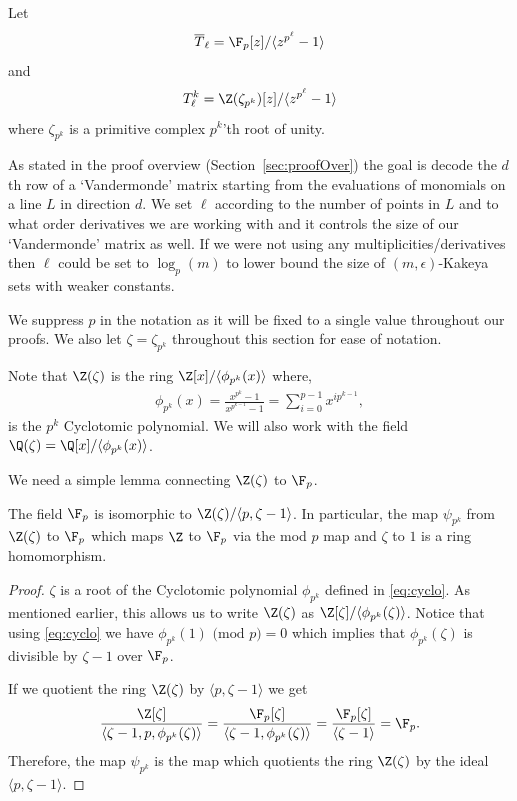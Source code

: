 \begin{define}
Let 
$$\overline{T}_{\ell}=\F_p[z]/\langle z^{p^\ell}-1\rangle$$ 
and 
$$T_{\ell}^k=\Z(\zeta_{p^k})[z]/\langle z^{p^\ell} -1\rangle$$
where $\zeta_{p^k}$ is a primitive complex $p^k$'th root of unity.
\end{define}

As stated in the proof overview (Section~\ref{sec:proofOver}) the goal is decode the $d$th row of a `Vandermonde' matrix starting from the evaluations of monomials on a line $L$ in direction $d$. We set $\ell$ according to the number of points in $L$ and to what order derivatives we are working with and it controls the size of our `Vandermonde' matrix as well. If we were not using any multiplicities/derivatives then $\ell$ could be set to $\log_p(m)$ to lower bound the size of $(m,\epsilon)$-Kakeya sets with weaker constants.

We suppress $p$ in the notation as it will be fixed to a single value throughout our proofs. We also let $\zeta=\zeta_{p^k}$ throughout this section for ease of notation.

Note that $\Z(\zeta)$ is the ring $\Z[x]/\langle \phi_{p^k}(x)\rangle$ where,
\begin{align}
    \phi_{p^k}(x)=\frac{x^{p^k}-1}{x^{p^{k-1}}-1}=\sum\limits_{i=0}^{p-1} x^{ip^{k-1}}\label{eq:cyclo},
\end{align}
is the $p^k$ Cyclotomic polynomial. We will also work with the field $\Q(\zeta)=\Q[x]/\langle \phi_{p^k}(x)\rangle$. 

We need a simple lemma connecting $\Z(\zeta)$ to $\F_p$.

\begin{lem}
The field $\F_p$ is isomorphic to $\Z(\zeta)/\langle p,\zeta-1\rangle$. In particular, the map $\psi_{p^k}$ from $\Z(\zeta)$ to $\F_p$ which maps $\Z$ to $\F_p$ via the mod $p$ map and $\zeta$ to $1$ is a ring homomorphism.
\end{lem}
\begin{proof}
$\zeta$ is a root of the Cyclotomic polynomial $\phi_{p^k}$ defined in \eqref{eq:cyclo}.
As mentioned earlier, this allows us to write $\Z(\zeta)$ as $\Z[\zeta]/\langle \phi_{p^k}(\zeta)\rangle$. Notice that using \eqref{eq:cyclo} we have $\phi_{p^k}(1)\text{ (mod }p\text{)}=0 $ which implies that $\phi_{p^k}(\zeta)$ is divisible by $\zeta-1$ over $\F_p$.

If we quotient the ring $\Z(\zeta)$ by $\langle p,\zeta-1\rangle$ we get 
$$\frac{\Z[\zeta]}{\langle \zeta-1,p, \phi_{p^k}(\zeta)\rangle}=\frac{\F_p[\zeta]}{\langle \zeta-1, \phi_{p^k}(\zeta)\rangle}=\frac{\F_p[\zeta]}{\langle \zeta-1\rangle}=\F_p.$$
Therefore, the map $\psi_{p^k}$ is the map which quotients the ring $\Z(\zeta)$ by the ideal $\langle p, \zeta-1 \rangle$.
\end{proof}

